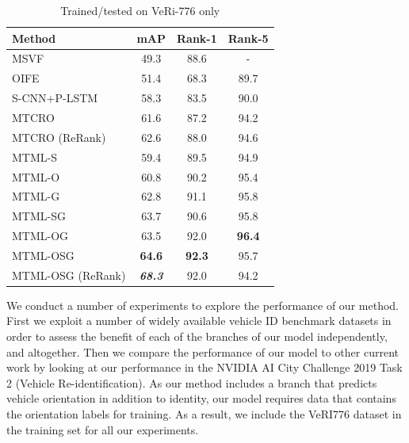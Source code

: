 \documentclass[10pt,twocolumn,letterpaper]{article}
\begin{document}
\begin{table}[h]
  \centering
  \begin{tabular}{l || c | c | c }
    \hline
    Method & mAP & Rank-1 & Rank-5 \\
    \hline
    MSVF \cite{kanaci2018vehicle} & 49.3 & 88.6 & - \\
    OIFE \cite{wang2017orientation} & 51.4 & 68.3 & 89.7 \\
    S-CNN+P-LSTM \cite{Shen_2017_ICCV} & 58.3 & 83.5 & 90.0 \\
    MTCRO \cite{xu2018framework} & 61.6 & 87.2 & 94.2 \\
    MTCRO (ReRank) \cite{xu2018framework} & 62.6 & 88.0 & 94.6 \\
    \hline
    MTML-S & 59.4 & 89.5 & 94.9 \\
    MTML-O & 60.8 & 90.2 & 95.4 \\
    MTML-G & 62.8 & 91.1 & 95.8 \\
    \hline
    MTML-SG & 63.7 & 90.6 & 95.8 \\
    MTML-OG & 63.5 & 92.0 & \bf{96.4}\\
    MTML-OSG & \bf{64.6} & \bf{92.3} & 95.7 \\
    MTML-OSG (ReRank) & \bf{\emph{68.3}} & 92.0 & 94.2 \\
    \hline
  \end{tabular}
  \caption{Trained/tested on VeRi-776 only}
  \label{T:benchmark_results_veri}
\end{table}

We conduct a number of experiments to explore the performance of our method. First we exploit a number of widely available vehicle ID benchmark datasets in order to assess the benefit of each of the branches of our model independently, and altogether. Then we compare the performance of our model to other current work by looking at our performance in the NVIDIA AI City Challenge 2019 Task 2 (Vehicle Re-identification). As our method includes a branch that predicts vehicle orientation in addition to identity, our model requires data that contains the orientation labels for training. As a result, we include the VeRI776 \cite{liu2016veri} dataset in the training set for all our experiments.
\end{document}
